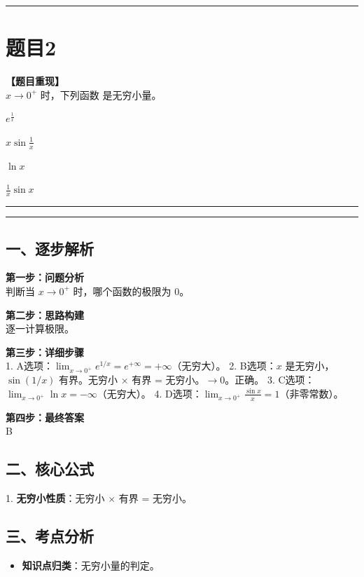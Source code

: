 \documentclass[12pt, a4paper]{ctexart}
\newcommand{\TopSeparator}{
    \par\noindent\rule{\textwidth}{1.5pt}\vspace{0.5em} %
}
\newcommand{\AnalysisSeparator}{
    \par\noindent\rule{\textwidth}{0.5pt}\vspace{0.2em}\hrule\vspace{0.5em} %
}
\newenvironment{RedAnalysis}{
    \par
    \color{red} %
}{
    \par
    \color{black} %
}
\newcommand{\choicesFour}[4]{
    \begin{enumerate}[label=\Alph*., itemsep=0pt, parsep=0pt, topsep=5pt, labelsep=0.5em]
        \begin{minipage}{0.22\linewidth} \item #1 \end{minipage}
        \begin{minipage}{0.22\linewidth} \item #2 \end{minipage}
        \begin{minipage}{0.22\linewidth} \item #3 \end{minipage}
        \begin{minipage}{0.22\linewidth} \item #4 \end{minipage}
    \end{enumerate}
}
\begin{document}
\vspace{2em}

\TopSeparator
\section*{题目2}

\textbf{【题目重现】} \\
$ x \rightarrow 0^{+} $ 时，下列函数 \underline{\hspace{1cm}} 是无穷小量。
\choicesFour{$ e^{\frac{1}{x}} $}{$ x\sin\frac{1}{x} $}{$ \ln x $}{$ \frac{1}{x}\sin x $}

\AnalysisSeparator

\begin{RedAnalysis}

\subsection*{一、逐步解析}

\textbf{第一步：问题分析} \\
判断当 $x \to 0^+$ 时，哪个函数的极限为 0。

\textbf{第二步：思路构建} \\
逐一计算极限。

\textbf{第三步：详细步骤} \\
1. A选项：$\lim_{x\to 0^+} e^{1/x} = e^{+\infty} = +\infty$（无穷大）。
2. B选项：$x$ 是无穷小，$\sin(1/x)$ 有界。无穷小 $\times$ 有界 = 无穷小。$\to 0$。正确。
3. C选项：$\lim_{x\to 0^+} \ln x = -\infty$（无穷大）。
4. D选项：$\lim_{x\to 0^+} \frac{\sin x}{x} = 1$（非零常数）。

\textbf{第四步：最终答案} \\
B

\subsection*{二、核心公式}
1. \textbf{无穷小性质}：无穷小 $\times$ 有界 = 无穷小。

\subsection*{三、考点分析}
\begin{itemize}
    \item \textbf{知识点归类}：无穷小量的判定。
\end{itemize}

\end{RedAnalysis}
\end{document}
